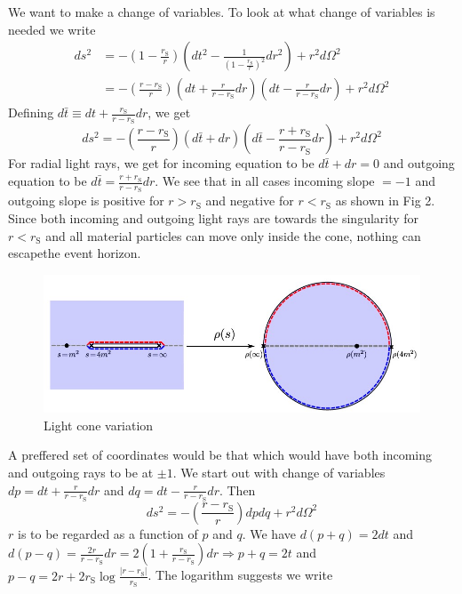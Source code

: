 ﻿\documentclass[12pt,a4paper]{article}
\begin{document}
We want to make a change of variables. To look at what change of variables is needed we write
$$
\begin{aligned}
d s^{2} &=-\left(1-\frac{r_{\mathrm{S}}}{r}\right)\left(d t^{2}-\frac{1}{\left(1-\frac{r_{\mathrm{S}}}{r}\right)^{2}} d r^{2}\right)+r^{2} d \Omega^{2} \\
&=-\left(\frac{r-r_{\mathrm{S}}}{r}\right)\left(d t+\frac{r}{r-r_{\mathrm{S}}} d r\right)\left(d t-\frac{r}{r-r_{\mathrm{S}}} d r\right)+r^{2} d \Omega^{2}
\end{aligned}
$$
Defining $d \bar{t} \equiv d t+\frac{r_{\mathrm{S}}}{r-r_{\mathrm{S}}} d r$, we get
$$
d s^{2} =-\left(\frac{r-r_{\mathrm{S}}}{r}\right)(d \bar{t}+d r)\left(d \bar{t}-\frac{r+r_{\mathrm{S}}}{r-r_{\mathrm{S}}} d r\right)+r^{2} d \Omega^{2}
$$
For radial light rays, we get for incoming equation to be $d \bar{t}+d r=0$ and outgoing equation to be $d \bar{t}=\frac{r+r_{\mathrm{S}}}{r-r_{\mathrm{S}}} d r$. We see that in all cases incoming slope $=-1$ and outgoing slope is positive for $r>r_{\mathrm{S}}$ and negative for $r<r_{\mathrm{S}}$ as shown in Fig 2. Since both incoming and outgoing light rays are towards the singularity for $r<r_{\mathrm{S}}$ and all material particles can move only inside the cone, nothing can escapethe event horizon.
\begin{figure}[H]
  \includegraphics[width=\linewidth]{2.jpg}
  \caption{Light cone variation}
  \label{fig:2}
\end{figure}
A preffered set of coordinates would be that which would have both incoming and outgoing rays to be at $\pm 1$. We start out with change of variables
$d p=d t+\frac{r}{r-r_{\mathrm{S}}} d r$ and $d q=d t-\frac{r}{r-r_{\mathrm{S}}} d r$. Then
$$
d s^{2}=-\left(\frac{r-r_{\mathrm{S}}}{r}\right) d p d q+r^{2} d \Omega^{2}
$$
$r$ is to be regarded as a function of $p$ and $q$. We have $d(p+q)=2 d t$ and $d(p-q)=\frac{2 r}{r-r_{\mathrm{S}}} d r=2\left(1+\frac{r_{\mathrm{S}}}{r-r_{\mathrm{S}}}\right) d r \Rightarrow p+q=2 t$ and $p-q=2 r+2 r_{\mathrm{S}} \log \frac{\left|r-r_{\mathrm{S}}\right|}{r_{\mathrm{S}}}$. The logarithm suggests we write
\end{document}
